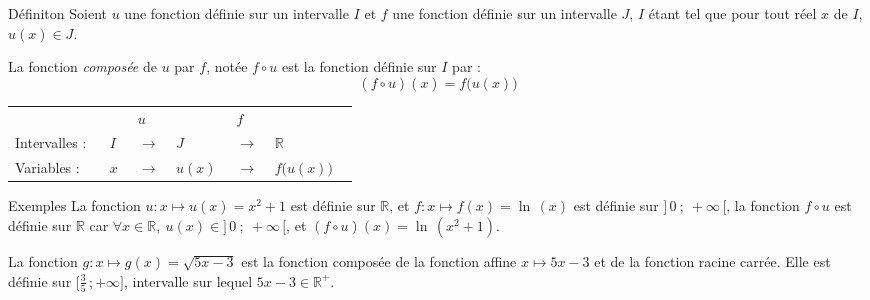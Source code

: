 \documentclass{coursbook}
\begin{document}
    \begin{Gpartie}{Définiton} 
        Soient $u$ une fonction définie sur un intervalle $I$ et $f$ une fonction définie sur un intervalle $J$, $I$ étant tel que pour tout réel $x$ de $I$, $u(x)\in J$.

        La fonction \emph{composée} de $u$ par $f$, notée $f\circ u$ est la fonction définie sur $I$ par :
        \[\boxed{(f\circ u)(x)=f\big(u(x)\big)}\]

        \begin{center}\begin{tabular}{ p{0.15\linewidth} *{2}{M{0.05\linewidth} M{0.025\linewidth} } M{0.1\linewidth} }
            & $u$           &       & $f$           &                   \\
            Intervalles :& $I$   & $\rightarrow$ & $J$   & $\rightarrow$ & $\mathbb{R}$      \\
            Variables :  & $x$   & $\rightarrow$ & $u(x)$& $\rightarrow$ & $f\big(u(x)\big)$ \\
        \end{tabular}\end{center}
        \parbox{\linewidth}{}
        \begin{Spartie}{Exemples} 
            La fonction $u:x\mapsto u(x)=x^2+1$ est définie sur $\mathbb{R}$, et $f:x\mapsto f(x)=\ln\,(x)$ est définie sur $\big]\,0~;~+\infty\,\big[$, la fonction $f\circ u$ est définie sur $\mathbb{R}$ car $\forall x\in\mathbb{R},~u(x)\in\big]\,0~;~+\infty\,\big[$, et $(f\circ u)(x)=\ln\,\left(x^2+1\right)$.

            La fonction $g:x\mapsto g(x)=\sqrt{5x-3}$ est la fonction composée de la fonction affine $x\mapsto 5x-3$ et de la fonction racine carrée. Elle est définie sur $\Big[\frac{3}{5}\,;+\infty\Big]$, intervalle sur lequel $5x-3\in\mathbb{R^{+}}$.
        \end{Spartie}
    \end{Gpartie}
\end{document}
